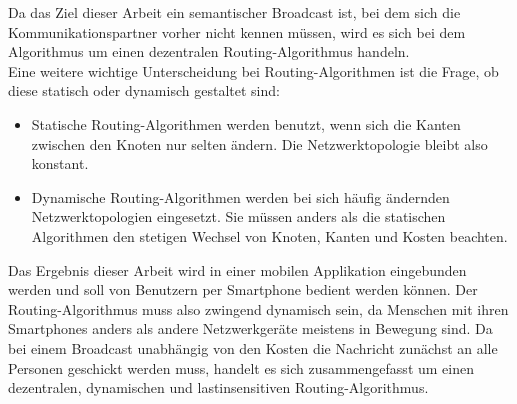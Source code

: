Da das Ziel dieser Arbeit ein semantischer Broadcast ist, bei dem sich die Kommunikationspartner vorher nicht kennen müssen, wird es sich bei dem Algorithmus um einen dezentralen Routing-Algorithmus handeln.
\\Eine weitere wichtige Unterscheidung bei Routing-Algorithmen ist die Frage, ob diese statisch oder dynamisch gestaltet sind:
\begin{itemize}
	\item Statische Routing-Algorithmen werden benutzt, wenn sich die Kanten zwischen den Knoten nur selten ändern. Die Netzwerktopologie bleibt also konstant.
	\item Dynamische Routing-Algorithmen werden bei sich häufig ändernden Netzwerktopologien eingesetzt. Sie müssen anders als die statischen Algorithmen den stetigen Wechsel von Knoten, Kanten und Kosten beachten.
\end{itemize}
Das Ergebnis dieser Arbeit wird in einer mobilen Applikation eingebunden werden und soll von Benutzern per Smartphone bedient werden können. Der Routing-Algorithmus muss also zwingend dynamisch sein, da Menschen mit ihren Smartphones anders als andere Netzwerkgeräte meistens in Bewegung sind. Da bei einem Broadcast unabhängig von den Kosten die Nachricht zunächst an alle Personen geschickt werden muss, handelt es sich zusammengefasst um einen dezentralen, dynamischen und \mbox{lastinsensitiven} Routing-Algorithmus. 
